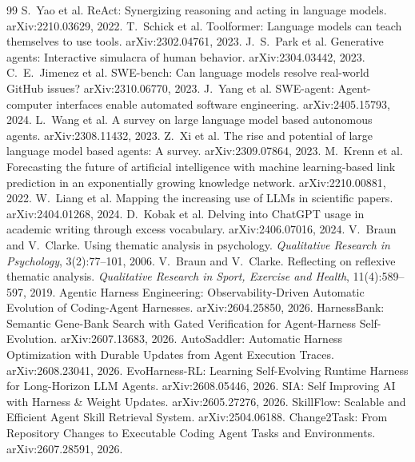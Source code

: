 \documentclass[10.5pt]{article}
\begin{document}
\begin{thebibliography}{99}\small
\setlength{\itemsep}{1pt}
 S.~Yao et al. ReAct: Synergizing reasoning and acting in language models. arXiv:2210.03629, 2022.
 T.~Schick et al. Toolformer: Language models can teach themselves to use tools. arXiv:2302.04761, 2023.
 J.~S.~Park et al. Generative agents: Interactive simulacra of human behavior. arXiv:2304.03442, 2023.
 C.~E.~Jimenez et al. SWE-bench: Can language models resolve real-world GitHub issues? arXiv:2310.06770, 2023.
 J.~Yang et al. SWE-agent: Agent-computer interfaces enable automated software engineering. arXiv:2405.15793, 2024.
 L.~Wang et al. A survey on large language model based autonomous agents. arXiv:2308.11432, 2023.
 Z.~Xi et al. The rise and potential of large language model based agents: A survey. arXiv:2309.07864, 2023.
 M.~Krenn et al. Forecasting the future of artificial intelligence with machine learning-based link prediction in an exponentially growing knowledge network. arXiv:2210.00881, 2022.
 W.~Liang et al. Mapping the increasing use of LLMs in scientific papers. arXiv:2404.01268, 2024.
 D.~Kobak et al. Delving into ChatGPT usage in academic writing through excess vocabulary. arXiv:2406.07016, 2024.
 V.~Braun and V.~Clarke. Using thematic analysis in psychology. \emph{Qualitative Research in Psychology}, 3(2):77--101, 2006.
 V.~Braun and V.~Clarke. Reflecting on reflexive thematic analysis. \emph{Qualitative Research in Sport, Exercise and Health}, 11(4):589--597, 2019.
 Agentic Harness Engineering: Observability-Driven Automatic Evolution of Coding-Agent Harnesses. arXiv:2604.25850, 2026.
 HarnessBank: Semantic Gene-Bank Search with Gated Verification for Agent-Harness Self-Evolution. arXiv:2607.13683, 2026.
 AutoSaddler: Automatic Harness Optimization with Durable Updates from Agent Execution Traces. arXiv:2608.23041, 2026.
 EvoHarness-RL: Learning Self-Evolving Runtime Harness for Long-Horizon LLM Agents. arXiv:2608.05446, 2026.
 SIA: Self Improving AI with Harness \& Weight Updates. arXiv:2605.27276, 2026.
 SkillFlow: Scalable and Efficient Agent Skill Retrieval System. arXiv:2504.06188.
 Change2Task: From Repository Changes to Executable Coding Agent Tasks and Environments. arXiv:2607.28591, 2026.

\end{thebibliography}
\end{document}
